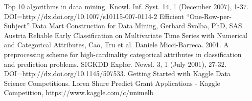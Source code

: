 \documentclass{article} %
\begin{document}
	\begin{thebibliography}{10} %
		 Top 10 algorithms in data mining. Knowl. Inf. Syst. 14, 1 (December 2007), 1-37. DOI=http://dx.doi.org/10.1007/s10115-007-0114-2
		 Efficient “One-Row-per-Subject” Data Mart Construction for Data Mining, Gerhard Svolba, PhD, SAS Austria
		 Reliable Early Classification on Multivariate Time Series with Numerical and Categorical Attributes, Cao, Tru et al.
		Daniele Micci-Barreca. 2001. A preprocessing scheme for high-cardinality categorical attributes in classification and prediction problems. SIGKDD Explor. Newsl. 3, 1 (July 2001), 27-32. DOI=http://dx.doi.org/10.1145/507533.
		 Getting Started with Kaggle Data Science Competitions. Loren Shure
		 Predict Grant Applications - Kaggle Competition, https://www.kaggle.com/c/unimelb 
	\end{thebibliography}
	
	
\end{document}
